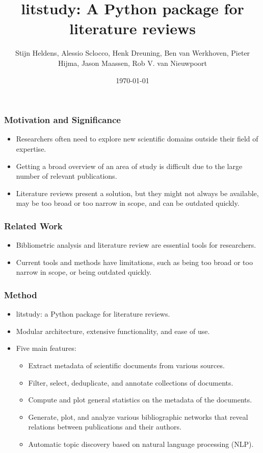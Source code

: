 \documentclass{beamer}
\title{litstudy: A Python package for literature reviews}
\author{Stijn Heldens, Alessio Sclocco, Henk Dreuning, Ben van Werkhoven, Pieter Hijma, Jason Maassen, Rob V. van Nieuwpoort}
\date{\today}
\begin{document}
\begin{frame}
\titlepage
\end{frame}
\begin{frame}
\frametitle{Motivation and Significance}
\begin{itemize}
\item Researchers often need to explore new scientific domains outside their field of expertise.
\item Getting a broad overview of an area of study is difficult due to the large number of relevant publications.
\item Literature reviews present a solution, but they might not always be available, may be too broad or too narrow in scope, and can be outdated quickly.
\end{itemize}
\end{frame}
\begin{frame}
\frametitle{Related Work}
\begin{itemize}
\item Bibliometric analysis and literature review are essential tools for researchers.
\item Current tools and methods have limitations, such as being too broad or too narrow in scope, or being outdated quickly.
\end{itemize}
\end{frame}
\begin{frame}
\frametitle{Method}
\begin{itemize}
\item litstudy: a Python package for literature reviews.
\item Modular architecture, extensive functionality, and ease of use.
\item Five main features:
\begin{itemize}
\item Extract metadata of scientific documents from various sources.
\item Filter, select, deduplicate, and annotate collections of documents.
\item Compute and plot general statistics on the metadata of the documents.
\item Generate, plot, and analyze various bibliographic networks that reveal relations between publications and their authors.
\item Automatic topic discovery based on natural language processing (NLP).
\end{itemize}
\end{itemize}
\end{frame}
\end{document}
